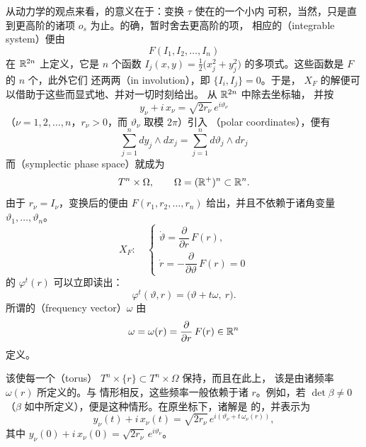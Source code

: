 从动力学的观点来看，\trBirkhoff\trNormalForm{}的意义在于：\trSymplectic{}变换%
$\tau$ 使\trHamiltonianSystem{}在\trEquilibrium{}的一个小\trNeighborhood{}内%
可积，当然，只是直到更高阶的诸项 $o_s$ 为止。的确，暂时舍去更高阶的项，%
相应的\textbf{\trIntegrableSystem}（integrable system）便由\trHamiltonianFunction
\[
F(I_1,I_2,\dotsc,I_n)
\]
在 $\mathbb{R}^{2n}$ 上定义，它是 $n$ 个函数 $I_j(x,y)=\frac{1}{2}\bigl(x_j^{2}+y_j^{2}\bigr)$%
的多项式。这些函数是 $F$ 的 $n$ 个\trFirstIntegral，此外它们%
还两两\textbf{\trInvolution}（in involution），即 $\{I_i,I_j\}=0$。于是，%
\trHamiltonianEquation{} $X_F$ 的解便可以借助于这些\trFirstIntegral{}而显式地、并对一切时刻给出。%
从 $\mathbb{R}^{2n}$ 中除去坐标轴，%
并按
\[
y_\nu+i\,x_\nu=\sqrt{2r_\nu}\,e^{i\vartheta_\nu}
\]
（$\nu=1,2,\dotsc,n$，$r_\nu>0$，而 $\vartheta_\nu$ 取模 $2\pi$）引入%
\trSymplectic{}\textbf{\trPolarCoordinates}（polar coordinates），便有
\[
\sum_{j=1}^{n}dy_j\wedge dx_j=\sum_{j=1}^{n}d\vartheta_j\wedge dr_j
\]
而\textbf{\trSymplectic\trPhaseSpace}（symplectic phase space）就成为
\[
T^{n}\times\Omega,\qquad\Omega=(\mathbb{R}^{+})^{n}\subset\mathbb{R}^{n}.
\]
由于 $r_\nu=I_\nu$，变换后的\trHamiltonianFunction{}便由%
$F(r_1,r_2,\dotsc,r_n)$ 给出，并且不依赖于诸角变量%
$\vartheta_1,\dotsc,\vartheta_n$。\trVectorField
\[
X_F:\quad
\begin{cases}
\dot{\vartheta}=\dfrac{\partial}{\partial r}\,F(r),\\[8pt]
\dot{r}=-\dfrac{\partial}{\partial\vartheta}\,F(r)=0
\end{cases}
\]
的\trFlow{} $\varphi^{t}(r)$ 可以立即读出：
\[
\varphi^{t}(\vartheta,r)=\bigl(\vartheta+t\omega,\ r\bigr).
\]
所谓的\textbf{\trFrequencyVector}（frequency vector）$\omega$ 由
\[
\omega=\omega(r)=\frac{\partial}{\partial r}\,F(r)\in\mathbb{R}^{n}
\]
定义。

该\trFlow{}使每一个\textbf{\trTorus}（torus）%
$T^{n}\times\{r\}\subset T^{n}\times\Omega$ 保持\trInvariant，而且在此\trTorus{}上，%
该\trFlow{}是由诸频率 $\omega(r)$ 所定义的\trLinear\trKronecker\trFlow。与%
\trLinear{}情形相反，这些频率一般依赖于诸\trFirstIntegral{} $r$。例如，若 $\det\beta\neq0$%
（$\beta$ 如\trNormalForm{}中所定义），便是这种情形。在原坐标下，诸解是%
\trQuasiPeriodic{}的，并表示为
\[
y_\nu(t)+i\,x_\nu(t)=\sqrt{2r_\nu}\,e^{i\left(\vartheta_\nu+t\,\omega_\nu(r)\right)},
\]
其中 $y_\nu(0)+i\,x_\nu(0)=\sqrt{2r_\nu}\,e^{i\vartheta_\nu}$。

